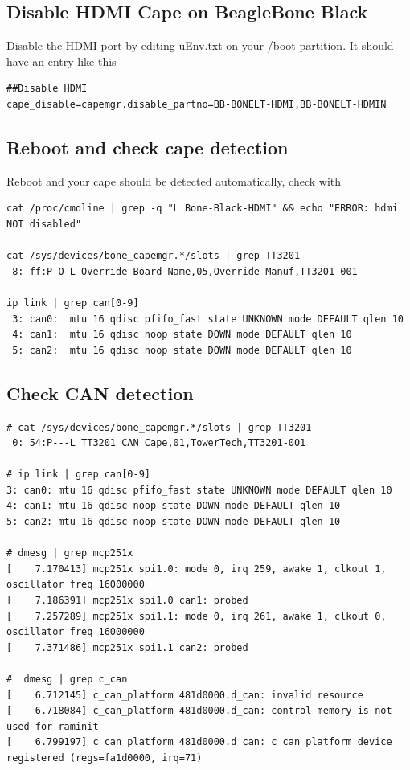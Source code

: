 \subsection{Disable HDMI Cape on BeagleBone Black}
Disable the HDMI port by editing uEnv.txt on your \url{/boot} partition.
It should have an entry like this

\begin{lstlisting}
##Disable HDMI
cape_disable=capemgr.disable_partno=BB-BONELT-HDMI,BB-BONELT-HDMIN
\end{lstlisting}


\subsection{Reboot and check cape detection}
Reboot and your cape should be detected automatically, check with
\begin{lstlisting}
cat /proc/cmdline | grep -q "L Bone-Black-HDMI" && echo "ERROR: hdmi NOT disabled"

cat /sys/devices/bone_capemgr.*/slots | grep TT3201
 8: ff:P-O-L Override Board Name,05,Override Manuf,TT3201-001

ip link | grep can[0-9]
 3: can0:  mtu 16 qdisc pfifo_fast state UNKNOWN mode DEFAULT qlen 10
 4: can1:  mtu 16 qdisc noop state DOWN mode DEFAULT qlen 10
 5: can2:  mtu 16 qdisc noop state DOWN mode DEFAULT qlen 10
\end{lstlisting}

\subsection{Check CAN detection}
\begin{lstlisting}
# cat /sys/devices/bone_capemgr.*/slots | grep TT3201
 0: 54:P---L TT3201 CAN Cape,01,TowerTech,TT3201-001

# ip link | grep can[0-9]
3: can0: mtu 16 qdisc pfifo_fast state UNKNOWN mode DEFAULT qlen 10
4: can1: mtu 16 qdisc noop state DOWN mode DEFAULT qlen 10
5: can2: mtu 16 qdisc noop state DOWN mode DEFAULT qlen 10

# dmesg | grep mcp251x
[    7.170413] mcp251x spi1.0: mode 0, irq 259, awake 1, clkout 1, oscillator freq 16000000
[    7.186391] mcp251x spi1.0 can1: probed
[    7.257289] mcp251x spi1.1: mode 0, irq 261, awake 1, clkout 0, oscillator freq 16000000
[    7.371486] mcp251x spi1.1 can2: probed

#  dmesg | grep c_can  
[    6.712145] c_can_platform 481d0000.d_can: invalid resource
[    6.718084] c_can_platform 481d0000.d_can: control memory is not used for raminit
[    6.799197] c_can_platform 481d0000.d_can: c_can_platform device registered (regs=fa1d0000, irq=71)
\end{lstlisting}


